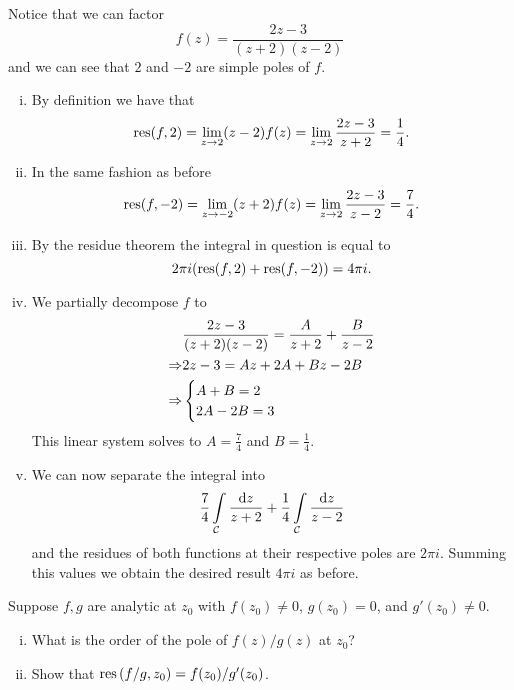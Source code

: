 \documentclass[12pt]{memoir}
\begin{document}
\begin{ptcbr}
    Notice that we can factor 
    $$f(z)=\frac{2z-3}{(z+2)(z-2)}$$
    and we can see that $2$ and $-2$ are simple poles of $f$.
    \begin{enumerate}[i)]
        \itemsep=-0.4em
        \item By definition we have that 
        $$\operatorname*{res}(f,2)=\lim_{z\to 2}(z-2)f(z)=\lim_{z\to 2}\frac{2z-3}{z+2}=\frac{1}{4}.$$
        \item In the same fashion as before
        $$\operatorname*{res}(f,-2)=\lim_{z\to -2}(z+2)f(z)=\lim_{z\to 2}\frac{2z-3}{z-2}=\frac{7}{4}.$$
        \item By the residue theorem the integral in question is equal to 
        $$2\pi i(\operatorname*{res}(f,2)+\operatorname*{res}(f,-2))=4\pi i.$$
        \item We partially decompose $f$ to 
        \begin{align*}
            &\frac{2z-3}{(z+2)(z-2)}=\frac{A}{z+2}+\frac{B}{z-2}\\    
            \Rightarrow&2z-3=Az+2A+Bz-2B\\
            \Rightarrow&\begin{cases}
                A+B=2\\
                2A-2B=3
            \end{cases}
        \end{align*}
        This linear system solves to $A=\frac{7}{4}$ and $B=\frac{1}{4}$. 
        \item We can now separate the integral into 
        $$\frac74\int\limits_{\mathcal{C}}\frac{\dd z}{z+2}+\frac14\int\limits_{\mathcal{C}}\frac{\dd z}{z-2}$$
        and the residues of both functions at their respective poles are $2\pi i$. Summing this values we obtain the desired result $4\pi i$ as before.
    \end{enumerate}
\end{ptcbr}

\begin{Ej}
    Suppose $f,g$ are analytic at $z_0$ with $f(z_0)\neq 0$, $g(z_0)=0$, and $g'(z_0)\neq 0$.
    \begin{enumerate}[i)]
        \itemsep=-0.4em
        \item What is the order of the pole of $f(z)/g(z)$ at $z_0$?
        \item Show that $\operatorname*{res}\left(f/g,z_0\right)={f(z_0)}/{g'(z_0)}$.
    \end{enumerate}
\end{Ej}
\end{document}
